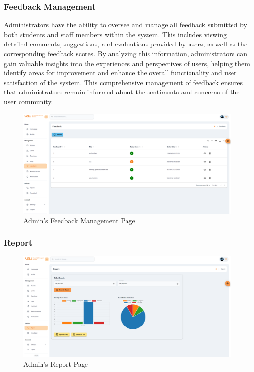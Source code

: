 	\subsubsection{Feedback Management}
	Administrators have the ability to oversee and manage all feedback submitted by both students and staff members within the system. This includes viewing detailed comments, suggestions, and evaluations provided by users, as well as the corresponding feedback scores. By analyzing this information, administrators can gain valuable insights into the experiences and perspectives of users, helping them identify areas for improvement and enhance the overall functionality and user satisfaction of the system. This comprehensive management of feedback ensures that administrators remain informed about the sentiments and concerns of the user community.
	\begin{figure}[H]
		\centering
		\includegraphics[width=1\linewidth]{graphics/gui/admin/feedback-mng}
		\caption{Admin's Feedback Management Page}
		\label{fig:feedback-mng}
	\end{figure}
	
	
	\subsubsection{Report}
	\begin{figure}[H]
		\centering
		\includegraphics[width=1\linewidth]{graphics/gui/admin/report-util}
		\caption{Admin's Report Page}
		\label{fig:report-util}
	\end{figure}
	
